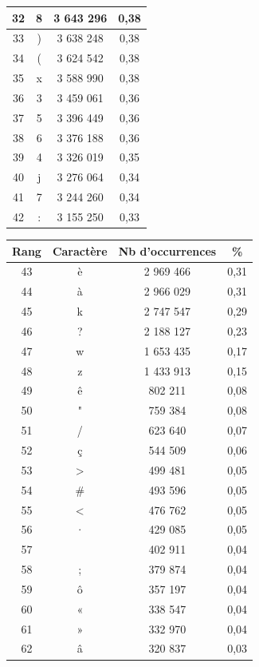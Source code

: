 \documentclass[a4paper,12pt,titlepage]{report}
\begin{document}
\begin{table}
\begin{tabular}{|c|c|c|c|}
\hline
32 & 8 &  3 643 296 & 0,38 \\
\hline
33 & ) &  3 638 248 & 0,38 \\
\hline
34 & ( &  3 624 542 & 0,38 \\
\hline
35 & x &  3 588 990 & 0,38 \\
\hline
36 & 3 &  3 459 061 & 0,36 \\
\hline
37 & 5 &  3 396 449 & 0,36 \\
\hline
38 & 6 &  3 376 188 & 0,36 \\
\hline
39 & 4 &  3 326 019 & 0,35 \\ 
\hline
40 & j &  3 276 064 & 0,34 \\
\hline
41 & 7 &  3 244 260 & 0,34 \\
\hline
42 & : &  3 155 250 & 0,33 \\
\hline
\end{tabular}
\begin{tabular}{|c|c|c|c|}
\hline
\textbf{Rang} & \textbf{Caractère} & \textbf{Nb d'occurrences} & \textbf{\%} \\
\hline
43 & è &  2 969 466 & 0,31 \\
\hline
44 & à &  2 966 029 & 0,31 \\
\hline
45 & k &  2 747 547 & 0,29 \\
\hline
46 & ? &  2 188 127 & 0,23 \\
\hline
47 & w &  1 653 435 & 0,17 \\
\hline
48 & z &  1 433 913 & 0,15 \\
\hline
49 & ê &	802 211 & 0,08 \\
\hline
50 & " &	759 384 & 0,08 \\
\hline
51 & / &	623 640 & 0,07 \\
\hline
52 & ç &	544 509 & 0,06 \\
\hline
53 & > &	499 481 & 0,05 \\
\hline
54 &\# &	493 596 & 0,05 \\
\hline
55 & < & 	476 762 & 0,05 \\
\hline
56 & · &	429 085 & 0,05 \\
\hline
57 &   &	402 911 & 0,04 \\
\hline
58 & ; &	379 874 & 0,04 \\
\hline
59 & ô &	357 197 & 0,04 \\
\hline
60 & « & 	338 547 & 0,04 \\
\hline
61 & » &	332 970 & 0,04 \\
\hline
62 & â &	320 837 & 0,03 \\

\end{tabular}
\end{table}
\end{document}
